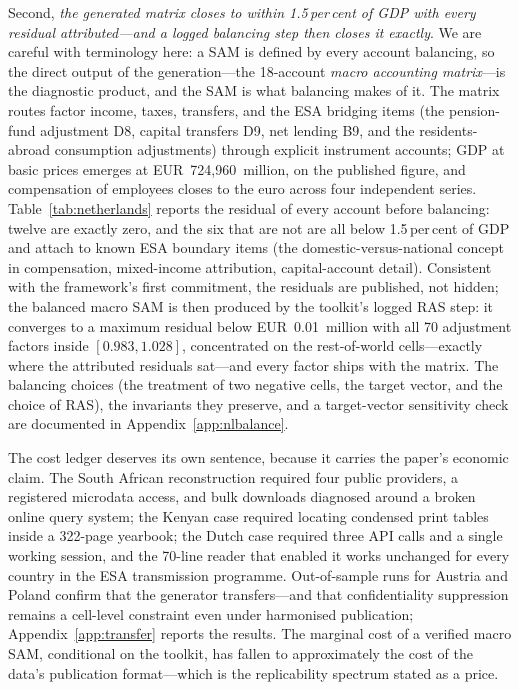 Second, \emph{the generated matrix closes to within 1.5\,per\,cent of
GDP with every residual attributed---and a logged balancing step then
closes it exactly}. We are careful with terminology here: a SAM is
defined by every account balancing, so the direct output of the
generation---the 18-account \emph{macro accounting matrix}---is the
diagnostic product, and the SAM is what balancing makes of it. The matrix
routes factor income, taxes, transfers, and the ESA bridging items (the
pension-fund adjustment D8, capital transfers D9, net lending B9, and the
residents-abroad consumption adjustments) through explicit instrument
accounts; GDP at basic prices emerges at EUR~724{,}960~million, on the
published figure, and compensation of employees closes to the euro across
four independent series. Table~\ref{tab:netherlands} reports the residual
of every account before balancing: twelve are exactly zero, and the six
that are not are all below 1.5\,per\,cent of GDP and attach to known ESA
boundary items (the domestic-versus-national concept in compensation,
mixed-income attribution, capital-account detail). Consistent with the
framework's first commitment, the residuals are published, not hidden;
the balanced macro SAM is then produced by the toolkit's logged RAS
step: it converges to a maximum residual below EUR~0.01~million with all
70 adjustment factors inside $[0.983, 1.028]$, concentrated on the
rest-of-world cells---exactly where the attributed residuals sat---and
every factor ships with the matrix. The balancing choices (the treatment
of two negative cells, the target vector, and the choice of RAS), the
invariants they preserve, and a target-vector sensitivity check are
documented in Appendix~\ref{app:nlbalance}.

\begin{table}[t]
\centering\small
\caption{Netherlands: account residuals of the generated 2019 macro
accounting matrix, before balancing (no benchmark consulted; GDP at basic
prices EUR 724{,}960m). The logged RAS step closes all residuals with
adjustment factors in $[0.983, 1.028]$.}
\label{tab:netherlands}

\end{table}

The cost ledger deserves its own sentence, because it carries the paper's
economic claim. The South African reconstruction required four public
providers, a registered microdata access, and bulk downloads diagnosed
around a broken online query system; the Kenyan case required locating
condensed print tables inside a 322-page yearbook; the Dutch case required
three API calls and a single working session, and the 70-line reader that
enabled it works unchanged for every country in the ESA transmission
programme. Out-of-sample runs for Austria and Poland confirm that the
generator transfers---and that confidentiality suppression remains a
cell-level constraint even under harmonised publication;
Appendix~\ref{app:transfer} reports the results. The marginal cost of a verified macro SAM, conditional on the
toolkit, has fallen to approximately the cost of the data's publication
format---which is the replicability spectrum stated as a price.
